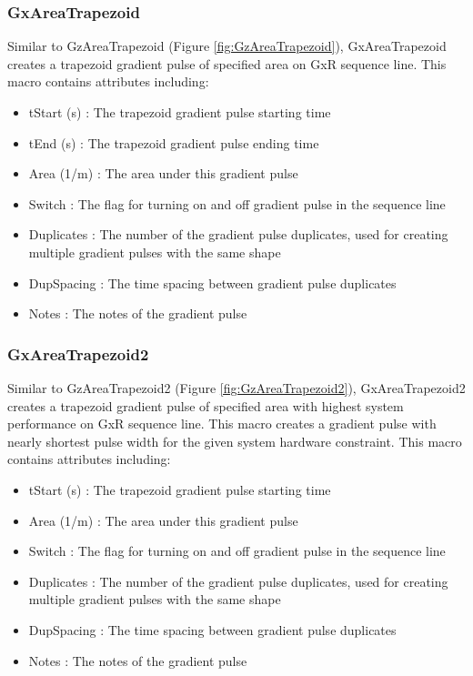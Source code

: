 \documentclass{book}%
\begin{document}
\subsubsection{GxAreaTrapezoid}

Similar to GzAreaTrapezoid (Figure \ref{fig:GzAreaTrapezoid}), GxAreaTrapezoid creates a trapezoid gradient pulse of specified area on GxR sequence line. This macro contains attributes including:

\begin{itemize}
	\item tStart (s) : The trapezoid gradient pulse starting time
	\item tEnd (s) : The trapezoid gradient pulse ending time
	\item Area (1/m) : The area under this gradient pulse
	\item Switch : The flag for turning on and off gradient pulse in the sequence line
	\item Duplicates : The number of the gradient pulse duplicates, used for creating multiple gradient pulses with the same shape
	\item DupSpacing : The time spacing between gradient pulse duplicates
	\item Notes : The notes of the gradient pulse 
\end{itemize}

\subsubsection{GxAreaTrapezoid2}

Similar to GzAreaTrapezoid2 (Figure \ref{fig:GzAreaTrapezoid2}), GxAreaTrapezoid2 creates a trapezoid gradient pulse of specified area with highest system performance on GxR sequence line. This macro creates a gradient pulse with nearly shortest pulse width for the given system hardware constraint. This macro contains attributes including:

\begin{itemize}
	\item tStart (s) : The trapezoid gradient pulse starting time
	\item Area (1/m) : The area under this gradient pulse
	\item Switch : The flag for turning on and off gradient pulse in the sequence line
	\item Duplicates : The number of the gradient pulse duplicates, used for creating multiple gradient pulses with the same shape
	\item DupSpacing : The time spacing between gradient pulse duplicates
	\item Notes : The notes of the gradient pulse 
\end{itemize}
\end{document}
